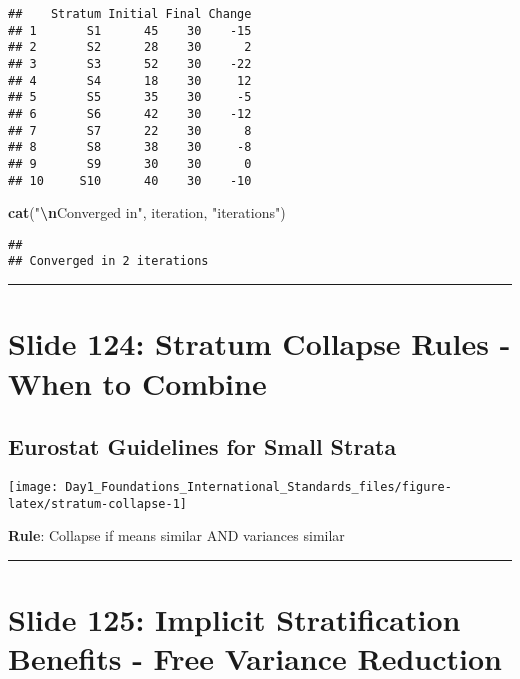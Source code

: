 \documentclass[
]{article}
\newenvironment{Shaded}{\begin{snugshade}}{\end{snugshade}}
\newcommand{\FunctionTok}[1]{\textcolor[rgb]{0.13,0.29,0.53}{\textbf{#1}}}
\newcommand{\NormalTok}[1]{#1}
\newcommand{\SpecialCharTok}[1]{\textcolor[rgb]{0.81,0.36,0.00}{\textbf{#1}}}
\newcommand{\StringTok}[1]{\textcolor[rgb]{0.31,0.60,0.02}{#1}}
\begin{document}
\begin{verbatim}
##    Stratum Initial Final Change
## 1       S1      45    30    -15
## 2       S2      28    30      2
## 3       S3      52    30    -22
## 4       S4      18    30     12
## 5       S5      35    30     -5
## 6       S6      42    30    -12
## 7       S7      22    30      8
## 8       S8      38    30     -8
## 9       S9      30    30      0
## 10     S10      40    30    -10
\end{verbatim}

\begin{Shaded}
\begin{Highlighting}[]
\FunctionTok{cat}\NormalTok{(}\StringTok{"}\SpecialCharTok{\textbackslash{}n}\StringTok{Converged in"}\NormalTok{, iteration, }\StringTok{"iterations"}\NormalTok{)}
\end{Highlighting}
\end{Shaded}

\begin{verbatim}
## 
## Converged in 2 iterations
\end{verbatim}

\begin{center}\rule{0.5\linewidth}{0.5pt}\end{center}

\section{Slide 124: Stratum Collapse Rules - When to
Combine}\label{slide-124-stratum-collapse-rules---when-to-combine}

\subsection{Eurostat Guidelines for Small
Strata}\label{eurostat-guidelines-for-small-strata}

\texttt{[image: Day1\_Foundations\_International\_Standards\_files/figure-latex/stratum-collapse-1]}

\textbf{Rule}: Collapse if means similar AND variances similar

\begin{center}\rule{0.5\linewidth}{0.5pt}\end{center}

\section{Slide 125: Implicit Stratification Benefits - Free Variance
Reduction}\label{slide-125-implicit-stratification-benefits---free-variance-reduction}
\end{document}
